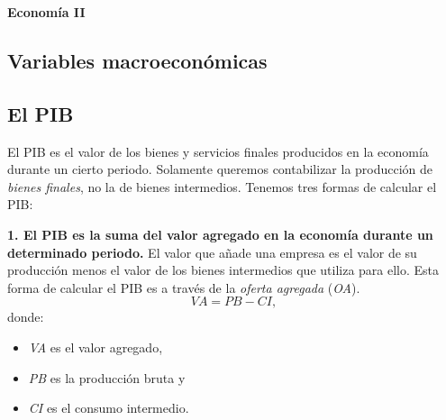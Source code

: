 \documentclass[10pt]{article}
\title{}
\begin{document}

\footnotesize

\begin{center}
     \Large{\textbf{Economía II}} \\
\end{center}
\begin{multicols*}{2}
\setlength{\premulticols}{1pt}
\setlength{\postmulticols}{1pt}
\setlength{\multicolsep}{1pt}
\setlength{\columnsep}{2pt}

\setlength{\abovedisplayskip}{0.25em}
\setlength{\belowdisplayskip}{0.25em}
\setlength{\abovedisplayshortskip}{0.25em}
\setlength{\belowdisplayshortskip}{0.25em}

\section{Variables macroeconómicas}
\subsection{El PIB}
El PIB es el valor de los bienes y servicios finales producidos en la economía durante un cierto periodo. Solamente queremos contabilizar la producción de \textit{bienes finales}, no la de bienes intermedios. Tenemos tres formas de calcular el PIB:

\textbf{1. El PIB es la suma del valor agregado en la economía durante un determinado periodo.} El valor que añade una empresa es el valor de su producción menos el valor de los bienes intermedios que utiliza para ello. Esta forma de calcular el PIB es a través de la \textit{oferta agregada} (\textit{OA}).
\[ \textit{VA} = \textit{PB} - \textit{CI}, \]
donde:
\begin{itemize}
    \item \textit{VA} es el valor agregado,
    \item \textit{PB} es la producción bruta y
    \item \textit{CI} es el consumo intermedio.
\end{itemize}


\end{multicols*}
\end{document}

